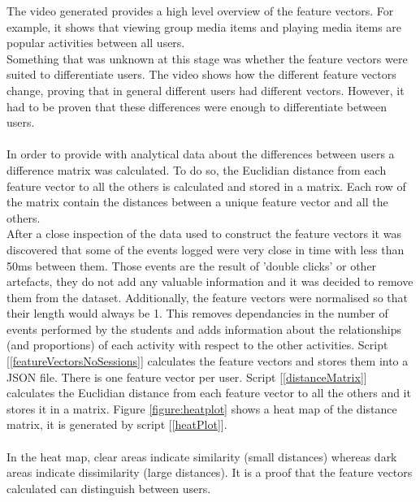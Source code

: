 \documentclass[11pt, oneside]{article}   	%
\begin{document}
\clearpage
\noindent The video generated provides a high level overview of the feature vectors. For example, it shows that viewing group media items and playing media items are popular activities between all users.\\ Something that was unknown at this stage was whether the feature vectors were suited to differentiate users. The video shows how the different feature vectors change, proving that in general different users had different vectors. However, it had to be proven that these differences were enough to differentiate between users.\\\\ %
In order to provide with analytical data about the differences between users a difference matrix was calculated. To do so, the Euclidian distance from each feature vector to all the others is calculated and stored in a matrix. Each row of the matrix contain the distances between a unique feature vector and all the others. %
\\After a close inspection of the data used to construct the feature vectors it was discovered that some of the events logged were very close in time with less than 50ms between them. Those events are the result of 'double clicks' or other artefacts, they do not add any valuable information and it was decided to remove them from the dataset. Additionally, the feature vectors were normalised so that their length would always be 1. This removes dependancies in the number of events performed by the students and adds information about the relationships (and proportions) of each activity with respect to the other activities. Script [\ref{featureVectorsNoSessions}] calculates the feature vectors and stores them into a JSON file. There is one feature vector per user. Script [\ref{distanceMatrix}] calculates the Euclidian distance from each feature vector to all the others and it stores it in a matrix. Figure \ref{figure:heatplot} shows a heat map of the distance matrix, it is generated by script [\ref{heatPlot}].\\\\
In the heat map, clear areas indicate similarity (small distances) whereas dark areas indicate dissimilarity (large distances). It is a proof that the feature vectors calculated can distinguish between users.
\end{document}
